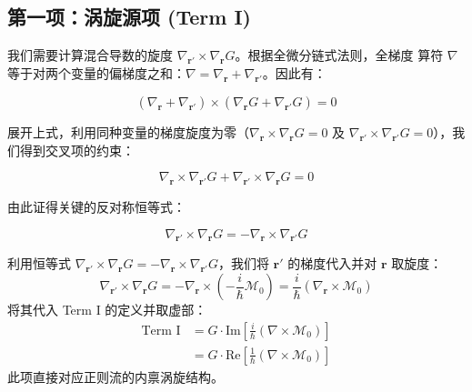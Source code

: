 \documentclass[a4paper,12pt]{article}
\begin{document}
\subsection{第一项：涡旋源项 (Term I)}

我们需要计算混合导数的旋度 $\nabla_{\mathbf{r}'} \times \nabla_{\mathbf{r}} G$。根据全微分链式法则，全梯度
算符 $\nabla$ 等于对两个变量的偏梯度之和：$\nabla = \nabla_{\mathbf{r}} + \nabla_{\mathbf{r}'}$。因此有：

\begin{equation}
    (\nabla_{\mathbf{r}} + \nabla_{\mathbf{r}'}) \times (\nabla_{\mathbf{r}} G + \nabla_{\mathbf{r}'} G) = 0
\end{equation}

展开上式，利用同种变量的梯度旋度为零（$\nabla_{\mathbf{r}} \times \nabla_{\mathbf{r}} G = 0$ 及 $\nabla_{\mathbf{r}'} \times \nabla_{\mathbf{r}'} G = 0$），我们得到交叉项的约束：

\begin{equation}
    \nabla_{\mathbf{r}} \times \nabla_{\mathbf{r}'} G + \nabla_{\mathbf{r}'} \times \nabla_{\mathbf{r}} G = 0
\end{equation}

由此证得关键的反对称恒等式：

\begin{equation}
    \nabla_{\mathbf{r}'} \times \nabla_{\mathbf{r}} G = - \nabla_{\mathbf{r}} \times \nabla_{\mathbf{r}'} G
    \label{eq:curl_identity_proof}
\end{equation}


利用恒等式 $\nabla_{\mathbf{r}'} \times \nabla_{\mathbf{r}} G = - \nabla_{\mathbf{r}} \times \nabla_{\mathbf{r}'} G$，我们将 $\mathbf{r}'$ 的梯度代入并对 $\mathbf{r}$ 取旋度：
\begin{equation}
    \nabla_{\mathbf{r}'} \times \nabla_{\mathbf{r}} G = -\nabla_{\mathbf{r}} \times \left( -\frac{i}{\hbar} \boldsymbol{\mathcal{M}}_0 \right) = \frac{i}{\hbar} (\nabla_{\mathbf{r}} \times \boldsymbol{\mathcal{M}}_0)
\end{equation}
将其代入 Term I 的定义并取虚部：
\begin{align}
    \text{Term I} &= G \cdot \text{Im} \left[ \frac{i}{\hbar} (\nabla \times \boldsymbol{\mathcal{M}}_0) \right] \nonumber \\
    &= G \cdot \text{Re} \left[ \frac{1}{\hbar} (\nabla \times \boldsymbol{\mathcal{M}}_0) \right]
    \label{eq:term1_result}
\end{align}
此项直接对应正则流的内禀涡旋结构。
\end{document}
